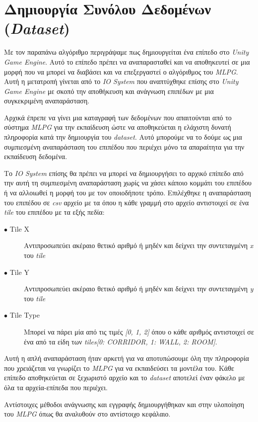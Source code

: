 \section{Δημιουργία Συνόλου Δεδομένων (\textit{Dataset})}
Με τον παραπάνω αλγόριθμο περιγράψαμε πως δημιουργείται ένα επίπεδο στο \textit{Unity Game Engine}. Αυτό το επίπεδο πρέπει να αναπαρασταθεί και να αποθηκευτεί σε μια μορφή που να μπορεί να διαβάσει και να επεξεργαστεί ο αλγόριθμος του \textit{MLPG}. Αυτή η μετατροπή γίνεται από το \textit{IO System} που αναπτύχθηκε επίσης στο \textit{Unity Game Engine} με σκοπό την αποθήκευση και ανάγνωση επιπέδων με μια συγκεκριμένη αναπαράσταση.
\par
Αρχικά έπρεπε να γίνει μια καταγραφή των δεδομένων που απαιτούνται από το σύστημα \textit{MLPG} για την εκπαίδευση ώστε να αποθηκεύεται η ελάχιστη δυνατή πληροφορία κατά την δημιουργία του \textit{dataset}. Αυτό μπορούμε να το δούμε ως μια συμπιεσμένη αναπαράσταση του επιπέδου που περιέχει μόνο τα απαραίτητα για την εκπαίδευση δεδομένα.
\par
Το \textit{IO System} επίσης θα πρέπει να μπορεί να δημιουργήσει το αρχικό επίπεδο από την αυτή τη συμπιεσμένη αναπαράσταση χωρίς να χάσει κάποιο κομμάτι του επιπέδου ή να αλλοιωθεί η μορφή του με τον οποιοδήποτε τρόπο. Επιλέχθηκε η αναπαράσταση του επιπέδου σε \textit{csv} αρχείο με τα όπου η κάθε γραμμή στο αρχείο αντιστοιχεί σε ένα \textit{tile} του επιπέδου με τα εξής πεδία:

\begin{description}
\item[$\bullet$ Tile X] Αντιπροσωπεύει ακέραιο θετικό αριθμό ή μηδέν και δείχνει την συντεταγμένη \textit{x} του \textit{tile}
\item[$\bullet$ Tile Y] Αντιπροσωπεύει ακέραιο θετικό αριθμό ή μηδέν και δείχνει την συντεταγμένη \textit{y} του \textit{tile}
\item[$\bullet$ Tile Type] Μπορεί να πάρει μία από τις τιμές \textit{[0, 1, 2]} όπου ο κάθε αριθμός αντιστοιχεί σε ένα από τα είδη των \textit{tiles}\textit{[0: CORRIDOR, 1: WALL, 2: ROOM]}.
\end{description}

Αυτή η απλή αναπαράσταση ήταν αρκετή για να αποτυπώσουμε όλη την πληροφορία που χρειάζεται να γνωρίζει το \textit{MLPG} για να εκπαιδεύσει τα μοντέλα του. Κάθε επίπεδο αποθηκεύεται σε ξεχωριστό αρχείο και το \textit{dataset} αποτελεί έναν φάκελο με όλα τα αρχεία-επίπεδα που περιέχει.
\par
Αντίστοιχες μέθοδοι ανάγνωσης και εγγραφής δημιουργήθηκαν και στην υλοποίηση του \textit{MLPG} όπως θα αναλυθούν στο αντίστοιχο κεφάλαιο.

